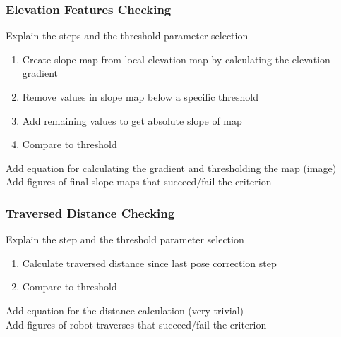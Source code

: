 \subsubsection{Elevation Features Checking}

Explain the steps and the threshold parameter selection

\begin{enumerate}
    \item Create slope map from local elevation map by calculating the elevation gradient
    \item Remove values in slope map below a specific threshold
    \item Add remaining values to get absolute slope of map
    \item Compare to threshold
\end{enumerate}

\noindent
Add equation for calculating the gradient and thresholding the map (image)\\
Add figures of final slope maps that succeed/fail the criterion

\subsubsection{Traversed Distance Checking}

Explain the step and the threshold parameter selection

\begin{enumerate}
    \item Calculate traversed distance since last pose correction step
    \item Compare to threshold
\end{enumerate}

\noindent
Add equation for the distance calculation (very trivial)\\
Add figures of robot traverses that succeed/fail the criterion

